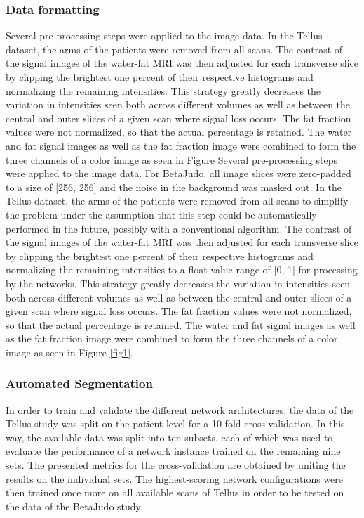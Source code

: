 \documentclass[10pt,letterpaper]{article}
\begin{document}
	\subsubsection*{Data formatting}
	Several pre-processing steps were applied to the image data. In the Tellus dataset, the arms of the patients were removed from all scans. The contrast of the signal images of the water-fat MRI was then adjusted for each transverse slice by clipping the brightest one percent of their respective histograms and normalizing the remaining intensities. This strategy greatly decreases the variation in intensities seen both across different volumes as well as between the central and outer slices of a given scan where signal loss occurs. The fat fraction values were not normalized, so that the actual percentage is retained. The water and fat signal images as well as the fat fraction image were combined to form the three channels of a color image as seen in Figure Several pre-processing steps were applied to the image data. For BetaJudo, all image slices were zero-padded to a size of [256, 256] and the noise in the background was masked out. In the Tellus dataset, the arms of the patients were removed from all scans to simplify the problem under the assumption that this step could be automatically performed in the future, possibly with a conventional algorithm. The contrast of the signal images of the water-fat MRI was then adjusted for each transverse slice by clipping the brightest one percent of their respective histograms and normalizing the remaining intensities to a float value range of [0, 1] for processing by the networks. This strategy greatly decreases the variation in intensities seen both across different volumes as well as between the central and outer slices of a given scan where signal loss occurs. The fat fraction values were not normalized, so that the actual percentage is retained. The water and fat signal images as well as the fat fraction image were combined to form the three channels of a color image as seen in Figure \ref{fig1}. \\



	\subsubsection*{Automated Segmentation}
	In order to train and validate the different network architectures, the data of the Tellus study was split on the patient level for a 10-fold cross-validation. In this way, the available data was split into ten subsets, each of which was used to evaluate the performance of a network instance trained on the remaining nine sets. The presented metrics for the cross-validation are obtained by uniting the results on the individual sets. The highest-scoring network configurations were then trained once more on all available scans of Tellus in order to be tested on the data of the BetaJudo study.
\end{document}

